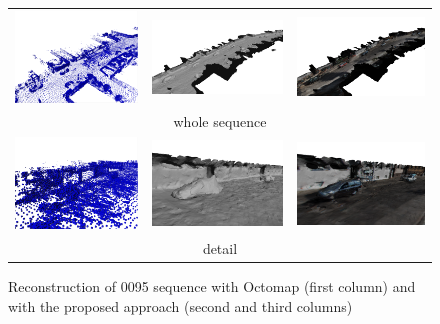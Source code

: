 \begin{figure}[tb]
 \centering
\setlength{\tabcolsep}{2px}
    \begin{tabular}{ccc}
    \includegraphics[width=0.33\columnwidth]{./img/ch-laser/octo06}&
    \includegraphics[width=0.33\columnwidth]{./img/ch-laser/proposed0600}&
    \includegraphics[width=0.33\columnwidth]{./img/ch-laser/proposed0601}\\
    \multicolumn{3}{c}{whole sequence}\\
    \includegraphics[width=0.33\columnwidth]{./img/ch-laser/octo05}&
    \includegraphics[width=0.33\columnwidth]{./img/ch-laser/proposed0501}&
    \includegraphics[width=0.33\columnwidth]{./img/ch-laser/proposed0500}\\
    \multicolumn{3}{c}{detail}
 \end{tabular}
 \caption{Reconstruction of 0095 sequence with Octomap (first column) and with the proposed approach (second and third columns)}
 \label{fig:resultOcto01}
\end{figure}



